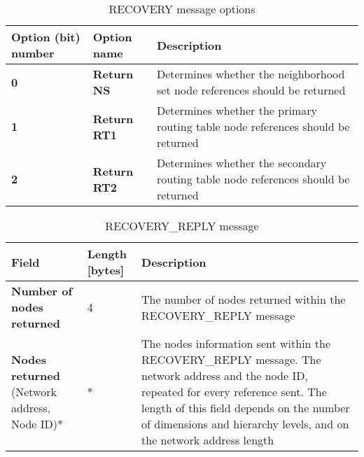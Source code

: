 \begin{table}[H]
\scriptsize
\begin{center}
\begin{tabular}{p{2.8cm} p{2.2cm} p{9.5cm}}
	\hline
	\textbf{Option (bit) number}			& \textbf{Option name}					& \textbf{Description}				\\[1mm]
    \hline
	\textbf{0}								& \textbf{Return NS}					& Determines whether the neighborhood set node references should be returned						\\[1.5mm]
	\textbf{1}								& \textbf{Return RT1}					& Determines whether the primary routing table node references should be returned					\\[1.5mm]
	\textbf{2}								& \textbf{Return RT2}					& Determines whether the secondary routing table node references should be returned					\\[1.5mm]
    \hline
\end{tabular}
\end{center}
\caption{RECOVERY message options}
\label{tab:mRecoveryOptions}
\end{table}



\begin{table}[H]
\scriptsize
\begin{center}
\begin{tabular}{p{3.3cm} p{1.7cm} p{9.5cm}}
	\hline
	\textbf{Field}						& \textbf{Length} [bytes]				& \textbf{Description}				\\[1mm]
    \hline
	\textbf{Number of nodes returned}	& 4											& The number of nodes returned within the RECOVERY\_REPLY message					\\[1.5mm]
	\textbf{Nodes returned} \newline (Network address, Node ID)*			& *			& The nodes information sent within the RECOVERY\_REPLY message. The network address and the node ID, repeated for every reference sent. \newline * The length of this field depends on the number of dimensions and hierarchy levels, and on the network address length		\\[1.5mm]	
    \hline
\end{tabular}
\end{center}
\caption{RECOVERY\_REPLY message}
\label{tab:mRecoveryReply}
\end{table}









